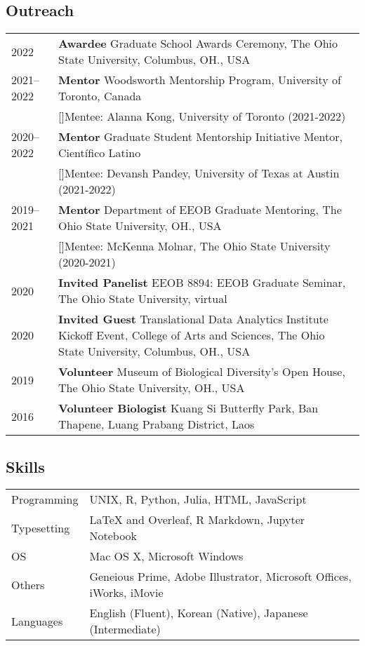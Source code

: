 \documentclass[11pt]{article}
\begin{document}
\subsection*{Outreach}
\begin{longtable}{p{}  p{}}
2022		& \textbf{Awardee} Graduate School Awards Ceremony, The Ohio State University, Columbus, OH., USA\\
2021--2022 & \textbf{Mentor} Woodsworth Mentorship Program, University of Toronto, Canada\\
		       &\hspace{1cm}[\ding{47}]Mentee: Alanna Kong, University of Toronto (2021-2022)\\
2020--2022& \textbf{Mentor} Graduate Student Mentorship Initiative Mentor, Científico Latino\\
			&\hspace{1cm}[\ding{47}]Mentee: Devansh Pandey, University of Texas at Austin (2021-2022)\\
2019--2021 & \textbf{Mentor} Department of EEOB Graduate Mentoring, The Ohio State University, OH., USA \\
		       &\hspace{1cm}[\ding{47}]Mentee: McKenna Molnar, The Ohio State University (2020-2021)\\
2020 &	\textbf{Invited Panelist} EEOB 8894: EEOB Graduate Seminar, The Ohio State University, virtual\\
2020 &	\textbf{Invited Guest} Translational Data Analytics Institute Kickoff Event, College of Arts and Sciences, The Ohio State University, Columbus, OH., USA\\
2019 & \textbf{Volunteer} Museum of Biological Diversity’s Open House, The Ohio State University, OH., USA\\
2016 &  \textbf{Volunteer Biologist} Kuang Si Butterfly Park, Ban Thapene, Luang Prabang District, Laos\vspace{5pt}\\
\end{longtable}


\subsection*{Skills}
\begin{longtable}{p{}  p{}}
Programming & UNIX, R, Python, Julia, HTML, JavaScript\\
Typesetting &  {\LaTeX} and Overleaf, R Markdown, Jupyter Notebook\\
OS & Mac OS X, Microsoft Windows\\
Others & Geneious Prime, Adobe Illustrator, Microsoft Offices, iWorks, iMovie\\
Languages &  English (Fluent), Korean (Native), Japanese (Intermediate)\vspace{5pt}\\
\end{longtable}
\end{document}
